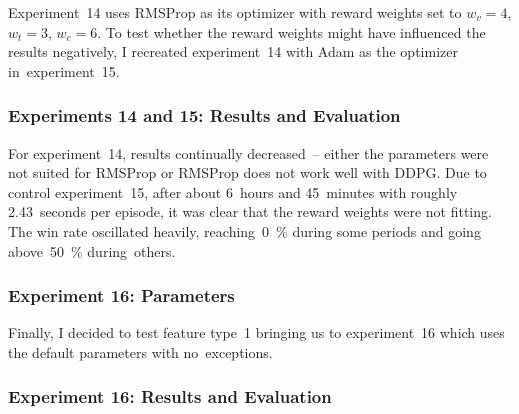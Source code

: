 \documentclass[a4paper,titlepage]{article}
\begin{document}
Experiment~14 uses RMSProp as its optimizer with reward weights set to $w_v = 4$, $w_t = 3$, $w_c = 6$. To test whether the reward weights might have influenced the results negatively, I recreated experiment~14 with Adam as the optimizer in~experiment~15.

\subsubsection*{Experiments 14 and 15: Results and Evaluation}

For experiment~14, results continually decreased~-- either the parameters were not suited for RMSProp or RMSProp does not work well with DDPG. Due to control experiment~15, after about 6~hours and 45~minutes with roughly 2.43~seconds per episode, it was clear that the reward weights were not fitting. The win rate oscillated heavily, reaching~0~\% during some periods and going above~50~\% during~others.

\subsubsection*{Experiment 16: Parameters}

Finally, I decided to test feature type~1 bringing us to experiment~16 which uses the default parameters with no~exceptions.

\subsubsection*{Experiment 16: Results and Evaluation}
\end{document}
